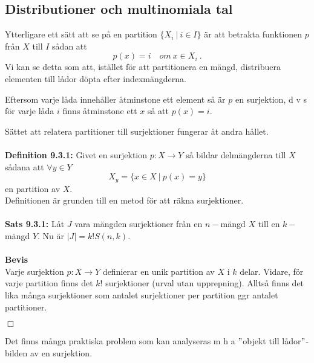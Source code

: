 \documentclass{article}
\begin{document}
\subsection{Distributioner och multinomiala tal}
Ytterligare ett sätt att se på en partition $\{X_i \ | \ i\in I\}$ är att betrakta funktionen $p$ från $X$ till $I$ sådan att 
$$
p(x)=i \quad om \ x\in X_i \ .
$$
Vi kan se detta som att, istället för att partitionera en mängd, distribuera elementen till lådor döpta efter indexmängderna.

Eftersom varje låda innehåller åtminstone ett element så är $p$ en surjektion, d v s för varje låda $i$ finns åtminstone ett $x$ så att $p(x)=i$.

Sättet att relatera partitioner till surjektioner fungerar åt andra hållet.\\ \\
\textbf{Definition 9.3.1:} Givet en surjektion $p:X\rightarrow Y$ så bildar delmängderna till $X$ sådana att $\forall y\in Y$
$$
X_y=\{x\in X \ | \ p(x)=y \} 
$$
en partition av $X$.\\

Definitionen är grunden till en metod för att räkna surjektioner.\\ \\
\textbf{Sats 9.3.1:} Låt $J$ vara mängden surjektioner från en $n-$mängd $X$ till en $k-$mängd $Y$. Nu är $|J|=k!S(n,k)$.\\ \\
\textbf{Bevis}\\
Varje surjektion $p:X\rightarrow Y$ definierar en unik partition av $X$ i $k$ delar. Vidare, för varje partition finns det $k!$ surjektioner (urval utan upprepning). Alltså finns det lika många surjektioner som antalet surjektioner per partition ggr antalet partitioner. 
\begin{flushright}
$\Box$
\end{flushright}
Det finns många praktiska problem som kan analyseras m h a $"$objekt till lådor$"$-bilden av en surjektion.
\end{document}
